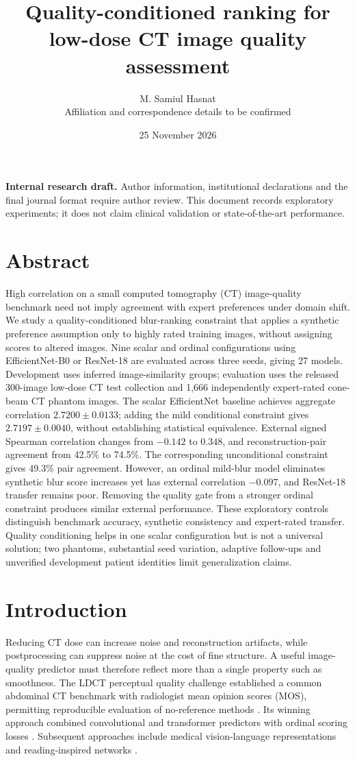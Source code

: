 \documentclass[11pt]{article}
\title{Quality-conditioned ranking for low-dose CT image quality assessment}
\author{M. Samiul Hasnat\\\small Affiliation and correspondence details to be confirmed}
\date{25 November 2026}
\begin{document}
\maketitle
\noindent\textbf{Internal research draft.} Author information, institutional declarations and the final journal format require author review. This document records exploratory experiments; it does not claim clinical validation or state-of-the-art performance.
\section*{Abstract}
High correlation on a small computed tomography (CT) image-quality benchmark need not imply agreement with expert preferences under domain shift. We study a quality-conditioned blur-ranking constraint that applies a synthetic preference assumption only to highly rated training images, without assigning scores to altered images. Nine scalar and ordinal configurations using EfficientNet-B0 or ResNet-18 are evaluated across three seeds, giving 27 models. Development uses inferred image-similarity groups; evaluation uses the released 300-image low-dose CT test collection and 1,666 independently expert-rated cone-beam CT phantom images. The scalar EfficientNet baseline achieves aggregate correlation $2.7200\pm0.0133$; adding the mild conditional constraint gives $2.7197\pm0.0040$, without establishing statistical equivalence. External signed Spearman correlation changes from $-0.142$ to $0.348$, and reconstruction-pair agreement from 42.5\% to 74.5\%. The corresponding unconditional constraint gives 49.3\% pair agreement. However, an ordinal mild-blur model eliminates synthetic blur score increases yet has external correlation $-0.097$, and ResNet-18 transfer remains poor. Removing the quality gate from a stronger ordinal constraint produces similar external performance. These exploratory controls distinguish benchmark accuracy, synthetic consistency and expert-rated transfer. Quality conditioning helps in one scalar configuration but is not a universal solution; two phantoms, substantial seed variation, adaptive follow-ups and unverified development patient identities limit generalization claims.
\section{Introduction}
Reducing CT dose can increase noise and reconstruction artifacts, while postprocessing can suppress noise at the cost of fine structure. A useful image-quality predictor must therefore reflect more than a single property such as smoothness. The LDCT perceptual quality challenge established a common abdominal CT benchmark with radiologist mean opinion scores (MOS), permitting reproducible evaluation of no-reference methods \cite{challenge}. Its winning approach combined convolutional and transformer predictors with ordinal scoring losses \cite{winner,rps}. Subsequent approaches include medical vision-language representations and reading-inspired networks \cite{medsiglip,clinreadnet}.
\end{document}
